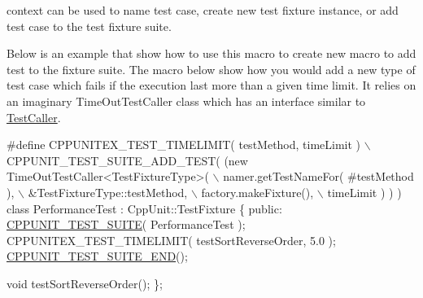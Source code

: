{\ttfamily context} can be used to name test case, create new test fixture instance, or add test case to the test fixture suite.

Below is an example that show how to use this macro to create new macro to add test to the fixture suite. The macro below show how you would add a new type of test case which fails if the execution last more than a given time limit. It relies on an imaginary Time\-Out\-Test\-Caller class which has an interface similar to \hyperlink{class_test_caller}{Test\-Caller}.


\begin{DoxyCode}
\textcolor{preprocessor}{#define CPPUNITEX\_TEST\_TIMELIMIT( testMethod, timeLimit )            \(\backslash\)}
\textcolor{preprocessor}{     CPPUNIT\_TEST\_SUITE\_ADD\_TEST( (new TimeOutTestCaller<TestFixtureType>(  \(\backslash\)}
\textcolor{preprocessor}{                 namer.getTestNameFor( #testMethod ),                \(\backslash\)}
\textcolor{preprocessor}{                 &TestFixtureType::testMethod,                   \(\backslash\)}
\textcolor{preprocessor}{                 factory.makeFixture(),                              \(\backslash\)}
\textcolor{preprocessor}{                 timeLimit ) ) )}
\textcolor{preprocessor}{}  
\textcolor{keyword}{class }PerformanceTest : CppUnit::TestFixture
\{
\textcolor{keyword}{public}:
  \hyperlink{group___writing_test_fixture_gabe1e12200f40d6f25d60c1783c99da81}{CPPUNIT\_TEST\_SUITE}( PerformanceTest );
  CPPUNITEX\_TEST\_TIMELIMIT( testSortReverseOrder, 5.0 );
  \hyperlink{group___writing_test_fixture_ga601b2e1d525f3947b216e28c625abcb1}{CPPUNIT\_TEST\_SUITE\_END}();

  \textcolor{keywordtype}{void} testSortReverseOrder();
\};
\end{DoxyCode}



